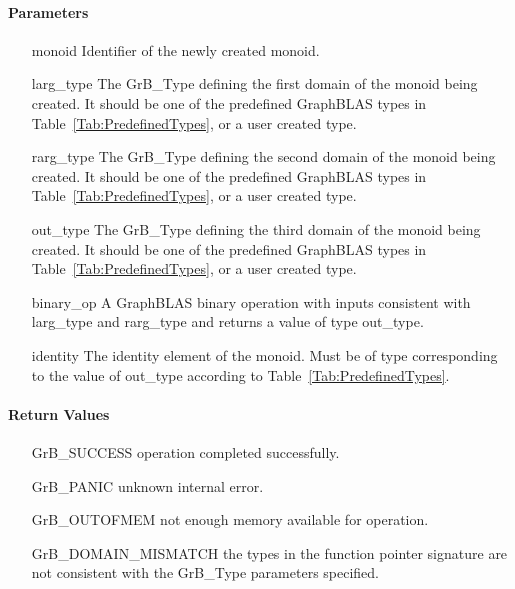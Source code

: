\paragraph{Parameters}

\begin{itemize}[leftmargin=1.1in]
    \item[{\sf monoid}]         Identifier of the newly created monoid.
    \item[{\sf larg\_type}]     The {\sf GrB\_Type} defining the first domain of the monoid 
    being created. It should be one of the predefined GraphBLAS types in
    Table~\ref{Tab:PredefinedTypes}, or a user created type.
    \item[{\sf rarg\_type}]     The {\sf GrB\_Type} defining the second domain of the monoid
    being created.  It should be one of the predefined GraphBLAS types in
    Table~\ref{Tab:PredefinedTypes}, or a user created type.
    \item[{\sf out\_type}]      The {\sf GrB\_Type} defining the third domain of the monoid 
    being created.  It should be one of the predefined GraphBLAS types in
    Table~\ref{Tab:PredefinedTypes}, or a user created type.
    \item[{\sf binary\_op}]     A GraphBLAS binary operation with inputs consistent
    with {\sf larg\_type} and {\sf rarg\_type} and returns a value of type {\sf out\_type}.
    \item[{\sf identity}]       The identity element of the monoid. 
    Must be of type corresponding to the value of {\sf out\_type} according to
    Table~\ref{Tab:PredefinedTypes}.
\end{itemize}

\paragraph{Return Values}

\begin{itemize}[leftmargin=2.1in]
\item[{\sf GrB\_SUCCESS}]           operation completed successfully.
\item[{\sf GrB\_PANIC}]             unknown internal error.
\item[{\sf GrB\_OUTOFMEM}]          not enough memory available for operation.
\item[{\sf GrB\_DOMAIN\_MISMATCH}]  the types in the function pointer signature are not   
                                    consistent with the {\sf GrB\_Type} parameters specified.
\end{itemize}

